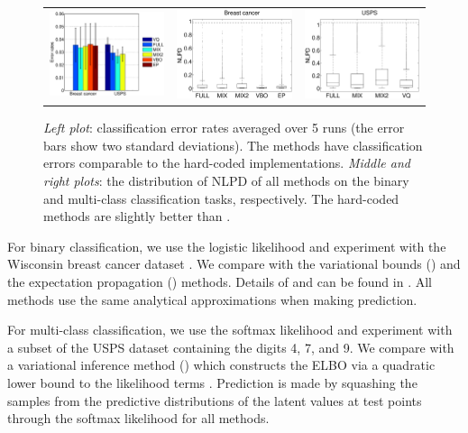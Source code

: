 \begin{figure}
\centering
\begin{tabular}{ccc}
\includegraphics[width=0.3\linewidth]{figures/classfication-errors.eps}  &
\includegraphics[width=0.3\linewidth]{figures/breast-nlpd.eps} &
\includegraphics[width=0.3\linewidth]{figures/usps-nlpd.eps} 
\end{tabular}
\caption{\emph{Left plot}: classification error rates averaged over 5 runs (the error bars show two standard deviations). The \agp \space methods have classification errors comparable to the hard-coded implementations. \emph{Middle and right plots}: the distribution of NLPD of all methods on the binary and multi-class classification tasks, respectively. The hard-coded methods are slightly better than \agp.}
\label{fig:classification}
\end{figure}

For binary classification, we use the logistic likelihood and experiment with the Wisconsin breast cancer 
 dataset \cite{uci2013}. %
We compare with the variational bounds (\vbo) and the expectation propagation (\ep) methods.
Details of \vbo \space and \ep \space can be found in  \cite{nickisch2008approximations}.
All  methods use the same analytical approximations when making prediction.

For multi-class classification, we use the softmax likelihood and experiment with a subset of the USPS dataset \cite{rasmussen-williams-book} containing the digits 4, 7, and 9.
We compare with a variational inference method  (\vq) which constructs the ELBO via a quadratic lower bound to the likelihood terms \cite{khan2012stick}.
Prediction is made by squashing the samples from the predictive distributions of the latent values at test points through the softmax likelihood for all methods.

